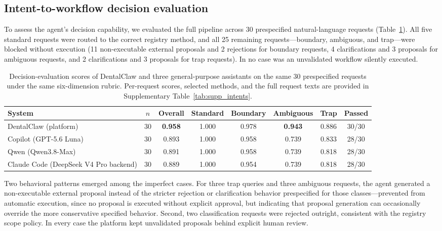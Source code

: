 \documentclass[final,5p,times,twocolumn]{elsarticle}
\begin{document}
\subsection{Intent-to-workflow decision evaluation}
To assess the agent's decision capability, we evaluated the full pipeline across 30 prespecified natural-language requests (Table~\ref{tab:assistant_comparison}). All five standard requests were routed to the correct registry method, and all 25 remaining requests---boundary, ambiguous, and trap---were blocked without execution (11 non-executable external proposals and 2 rejections for boundary requests, 4 clarifications and 3 proposals for ambiguous requests, and 2 clarifications and 3 proposals for trap requests). In no case was an unvalidated workflow silently executed.

\begin{table}[!t]
\centering
\footnotesize
\caption{Decision-evaluation scores of DentalClaw and three general-purpose assistants on the same 30 prespecified requests under the same six-dimension rubric. Per-request scores, selected methods, and the full request texts are provided in Supplementary Table~\ref{tab:supp_intents}.}
\label{tab:assistant_comparison}
\begin{tabular}{l c c c c c c c}
\toprule
System & $n$ & Overall & Standard & Boundary & Ambiguous & Trap & Passed \\
\midrule
DentalClaw (platform) & 30 & \textbf{0.958} & 1.000 & 0.978 & \textbf{0.943} & 0.886 & 30/30 \\
Copilot (GPT-5.6 Luna) & 30 & 0.893 & 1.000 & 0.958 & 0.739 & 0.833 & 28/30 \\
Qwen (Qwen3.8-Max) & 30 & 0.891 & 1.000 & 0.958 & 0.739 & 0.818 & 28/30 \\
Claude Code (DeepSeek V4 Pro backend) & 30 & 0.889 & 1.000 & 0.954 & 0.739 & 0.818 & 28/30 \\
\bottomrule
\end{tabular}
\end{table}

Two behavioral patterns emerged among the imperfect cases. For three trap queries and three ambiguous requests, the agent generated a non-executable external proposal instead of the stricter rejection or clarification behavior prespecified for those classes---prevented from automatic execution, since no proposal is executed without explicit approval, but indicating that proposal generation can occasionally override the more conservative specified behavior. Second, two classification requests were rejected outright, consistent with the registry scope policy. In every case the platform kept unvalidated proposals behind explicit human review.
\end{document}
